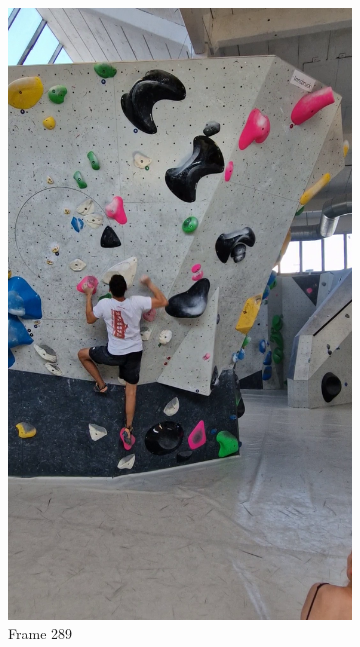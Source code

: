 \documentclass[./main.tex]{subfiles}
\begin{document}
\begin{figure}[htbp]
\begin{subfigure}{0.3\textwidth}
        \includegraphics[width=\textwidth]{entities/CA_289.png}
        \caption{Frame 289}
    \end{subfigure}
    \begin{subfigure}{0.3\textwidth}
        \centering

\end{subfigure}
\end{figure}
\end{document}
